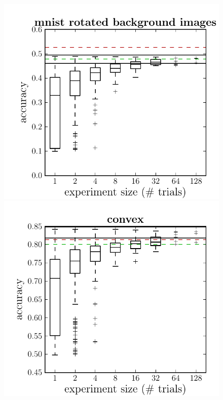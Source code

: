\documentclass{article}
\begin{document}
\begin{figure}
\begin{minipage}{0.9\linewidth}
    \includegraphics[scale=0.37]{figures/dbn_efficiency/dbn_efficiency_mnist_rotated_background_images}
    \includegraphics[scale=0.37]{figures/dbn_efficiency/dbn_efficiency_convex}

\end{minipage}
\end{figure}
\end{document}
